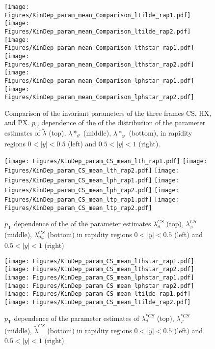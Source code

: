 \documentclass[12pt]{article}
\newcommand{\pT}{p_\mathrm{T}}
\newcommand{\absy}{\left |  y \right |}
\newcommand{\lamtilde}{\tilde{\lambda}}
\newcommand{\lamthstar}{\lambda*_\vartheta}
\newcommand{\lamphstar}{\lambda*_\varphi}
\newcommand{\lamthCS}{\lambda^{\scriptscriptstyle CS}_\vartheta}
\newcommand{\lamphCS}{\lambda^{\scriptscriptstyle CS}_\varphi}
\newcommand{\lamthphCS}{\lambda^{\scriptscriptstyle CS}_{\vartheta \varphi}}
\newcommand{\lamtildeCS}{\tilde{\lambda}^{\scriptscriptstyle CS}}
\newcommand{\lamthstarCS}{\lambda^{* \scriptscriptstyle CS}_\vartheta}
\newcommand{\lamphstarCS}{\lambda^{* \scriptscriptstyle CS}_\varphi}
\begin{document}




\begin{figure}[htbp]
\centering
\texttt{[image: Figures/KinDep\_param\_mean\_Comparison\_ltilde\_rap1.pdf]}
\texttt{[image: Figures/KinDep\_param\_mean\_Comparison\_ltilde\_rap2.pdf]}
\texttt{[image: Figures/KinDep\_param\_mean\_Comparison\_lthstar\_rap1.pdf]}
\texttt{[image: Figures/KinDep\_param\_mean\_Comparison\_lthstar\_rap2.pdf]}
\texttt{[image: Figures/KinDep\_param\_mean\_Comparison\_lphstar\_rap1.pdf]}
\texttt{[image: Figures/KinDep\_param\_mean\_Comparison\_lphstar\_rap2.pdf]}
\caption{Comparison of the invariant parameters of the three frames CS, HX,
and PX. $\pT$ dependence of the of the distribution of the
parameter estimates of $\lamtilde$ (top), $\lamthstar$ (middle), $\lamphstar$ (bottom), in rapidity regions $0<\absy<0.5$ (left) and
$0.5<\absy<1$ (right).}
\end{figure}
\clearpage





\begin{figure}[htbp]
\centering
\texttt{[image: Figures/KinDep\_param\_CS\_mean\_lth\_rap1.pdf]}
\texttt{[image: Figures/KinDep\_param\_CS\_mean\_lth\_rap2.pdf]}
\texttt{[image: Figures/KinDep\_param\_CS\_mean\_lph\_rap1.pdf]}
\texttt{[image: Figures/KinDep\_param\_CS\_mean\_lph\_rap2.pdf]}
\texttt{[image: Figures/KinDep\_param\_CS\_mean\_ltp\_rap1.pdf]}
\texttt{[image: Figures/KinDep\_param\_CS\_mean\_ltp\_rap2.pdf]}
\caption{$\pT$ dependence of the of the parameter estimates $\lamthCS$ (top), $\lamphCS$ (middle), $\lamthphCS$ (bottom) in rapidity regions $0<\absy<0.5$ (left) and $0.5<\absy<1$ (right)}
\end{figure}
\clearpage

\begin{figure}[htbp]
\centering
\texttt{[image: Figures/KinDep\_param\_CS\_mean\_lthstar\_rap1.pdf]}
\texttt{[image: Figures/KinDep\_param\_CS\_mean\_lthstar\_rap2.pdf]}
\texttt{[image: Figures/KinDep\_param\_CS\_mean\_lphstar\_rap1.pdf]}
\texttt{[image: Figures/KinDep\_param\_CS\_mean\_lphstar\_rap2.pdf]}
\texttt{[image: Figures/KinDep\_param\_CS\_mean\_ltilde\_rap1.pdf]}
\texttt{[image: Figures/KinDep\_param\_CS\_mean\_ltilde\_rap2.pdf]}
\caption{$\pT$ dependence of the parameter estimates of $\lamthstarCS$ (top),
$\lamphstarCS$ (middle), $\lamtildeCS$ (bottom) in rapidity regions $0<\absy<0.5$ (left) and $0.5<\absy<1$ (right)}
\end{figure}
\clearpage
\end{document}
